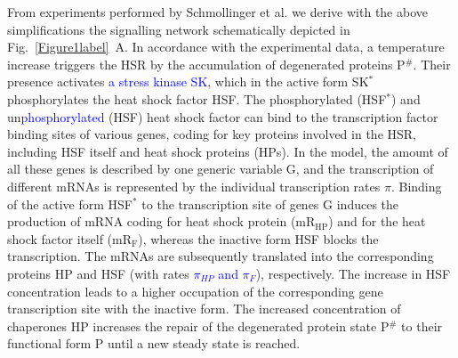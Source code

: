 \documentclass[oneside, 10pt, a4paper, twocolumn]{article}
\begin{document}
From  experiments performed by Schmollinger et al. \cite{Schmollinger2013} we derive with the above simplifications
the signalling network schematically depicted in Fig.~\ref{Figure1label}~A. %
In accordance with the experimental data, a temperature
increase triggers the HSR by the accumulation of
degenerated proteins P$^\#$. Their presence activates \textcolor{blue}{a stress
kinase SK}, which in the active form SK$^*$ phosphorylates the heat
shock factor HSF. The phosphorylated (HSF$^*$) and un\textcolor{blue}{phosphorylated}
(HSF) heat shock factor can bind to the transcription factor binding
sites of various genes, coding for key proteins involved in the HSR,
including HSF itself and heat shock proteins (HPs). 
In the model, the amount of all these genes is
described by one generic variable G, and the transcription of different mRNAs
is represented by the individual transcription rates $\pi$. Binding
of the active form HSF$^*$ to the transcription site of genes G induces the production of mRNA
coding for heat shock protein (mR$_{\text{HP}}$) and for the heat
shock factor itself (mR$_{\text{F}}$), whereas the inactive form HSF
blocks the transcription. The mRNAs are subsequently translated into
the corresponding proteins HP and HSF (with rates \textcolor{blue}{$\pi_{HP}$ and $\pi_{F}$}),
respectively. The increase in HSF concentration leads to a higher
occupation of the corresponding gene transcription site with the inactive form. The increased
concentration of chaperones HP increases the repair of the
degenerated protein state P$^\#$ to their functional form P until a new
steady state is reached.
\end{document}
